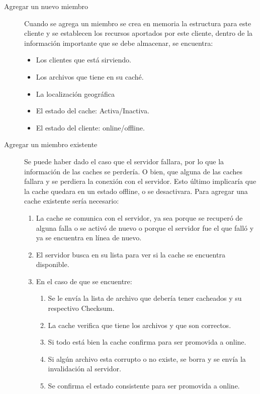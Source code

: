 \begin{description}
\item[Agregar un nuevo miembro] Cuando se agrega un miembro se crea en memoria la estructura para este cliente y se establecen los recursos aportados por este cliente, dentro de la información importante que se debe almacenar, se encuentra:
	\begin{itemize}
	\item Los clientes que está sirviendo.
	\item Los archivos que tiene en su caché.
	\item La localización geográfica 
	\item El estado del cache: Activa/Inactiva.
	\item El estado del cliente: online/offline.
	\end{itemize}
	
\item [Agregar un miembro existente] Se puede haber dado el caso que el servidor fallara, por lo que la información de las caches se perdería. O bien, que alguna de las caches fallara y se perdiera la conexión con el servidor. Esto último implicaría que la cache quedara en un estado offline, o se desactivara. Para agregar una cache existente sería necesario:

	\begin{enumerate}
	\item La cache se comunica con el servidor, ya sea porque se recuperó de alguna falla o se activó de nuevo o porque el servidor fue el que falló y ya se encuentra en línea de nuevo.
	\item El servidor busca en su lista para ver si la cache se encuentra disponible.
	\item En el caso de que se encuentre:

		\begin{enumerate}
		\item Se le envía la lista de archivo que debería tener cacheados y su respectivo Checksum.
		\item La cache verifica que tiene los archivos y que son correctos.
		\item Si todo está bien la cache confirma para ser promovida a online.
		\item Si algún archivo esta corrupto o no existe, se borra y se envía la invalidación al servidor.
		\item Se confirma el estado consistente para ser promovida a online.
		\end{enumerate}	
	

\end{enumerate}
\end{description}
